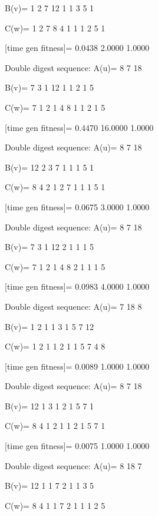 B(v)=
     1     2     7    12     1     1     3     5     1

C(w)=
     1     2     7     8     4     1     1     1     2     5     1

[time gen fitness]=
    0.0438    2.0000    1.0000

Double digest sequence:
A(u)=
     8     7    18

B(v)=
     7     3     1    12     1     1     2     1     5

C(w)=
     7     1     2     1     4     8     1     1     2     1     5

[time gen fitness]=
    0.4470   16.0000    1.0000

Double digest sequence:
A(u)=
     8     7    18

B(v)=
    12     2     3     7     1     1     1     5     1

C(w)=
     8     4     2     1     2     7     1     1     1     5     1

[time gen fitness]=
    0.0675    3.0000    1.0000

Double digest sequence:
A(u)=
     8     7    18

B(v)=
     7     3     1    12     2     1     1     1     5

C(w)=
     7     1     2     1     4     8     2     1     1     1     5

[time gen fitness]=
    0.0983    4.0000    1.0000

Double digest sequence:
A(u)=
     7    18     8

B(v)=
     1     2     1     1     3     1     5     7    12

C(w)=
     1     2     1     1     2     1     1     5     7     4     8

[time gen fitness]=
    0.0089    1.0000    1.0000

Double digest sequence:
A(u)=
     8     7    18

B(v)=
    12     1     3     1     2     1     5     7     1

C(w)=
     8     4     1     2     1     1     2     1     5     7     1

[time gen fitness]=
    0.0075    1.0000    1.0000

Double digest sequence:
A(u)=
     8    18     7

B(v)=
    12     1     1     7     2     1     1     3     5

C(w)=
     8     4     1     1     7     2     1     1     1     2     5

